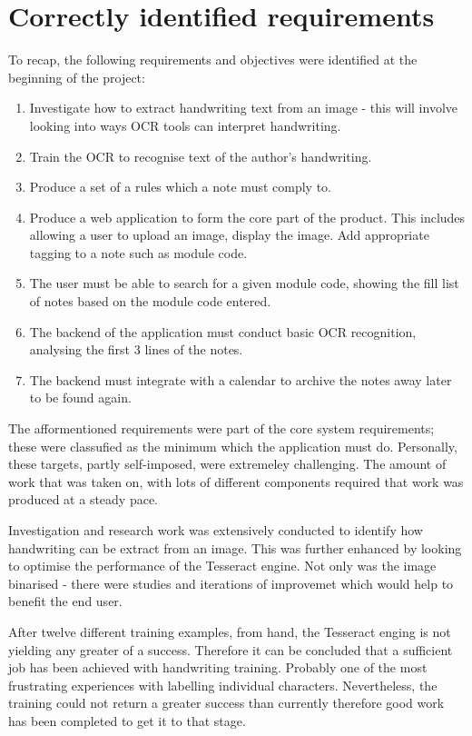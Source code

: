 \section{Correctly identified requirements}
To recap, the following requirements and objectives were identified at the beginning of the project:
\begin{enumerate}
	\item Investigate how to extract handwriting text from an image - this will involve looking into ways OCR tools can interpret handwriting.
	\item Train the OCR to recognise text of the author's handwriting.
	\item Produce a set of a rules which a note must comply to.
	\item Produce a web application to form the core part of the product. This includes allowing a user to upload an image, display the image. Add appropriate tagging to a note such as module code.
	\item The user must be able to search for a given module code, showing the fill list of notes based on the module code entered.
	\item The backend of the application must conduct basic OCR recognition, analysing the first 3 lines of the notes.
	\item The backend must integrate with a calendar to archive the notes away later to be found again.
\end{enumerate}

The afformentioned requirements were part of the core system requirements; these were classufied as the minimum which the application must do. Personally, these targets, partly self-imposed, were extremeley challenging. The amount of work that was taken on, with lots of different components required that work was produced at a steady pace.

Investigation and research work was extensively conducted to identify how handwriting can be extract from an image. This was further enhanced by looking to optimise the performance of the Tesseract engine. Not only was the image binarised - there were studies and iterations of improvemet which would help to benefit the end user.

After twelve different training examples, from hand, the Tesseract enging is not yielding any greater of a success. Therefore it can be concluded that a sufficient job has been achieved with handwriting training. Probably one of the most frustrating experiences with labelling individual characters. Nevertheless, the training could not return a greater success than currently therefore good work has been completed to get it to that stage.


